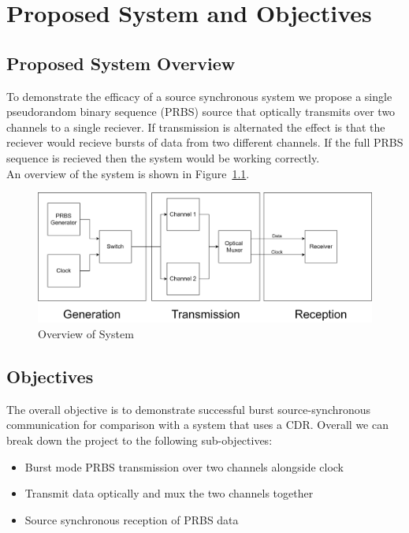 \chapter{Proposed System and Objectives}

\section{Proposed System Overview}%
\label{sec:system_overview}
To demonstrate the efficacy of a source synchronous system we propose a single
pseudorandom binary sequence (PRBS) source that optically transmits over two
channels to a single reciever. If transmission is alternated the effect is that
the reciever would recieve bursts of data from two different channels. If the
full PRBS sequence is recieved then the system would be working correctly.\\ An
overview of the system is shown in Figure~\ref{fig:overview}. 

\begin{figure}[h]
    \centering
    \includegraphics[width=1\linewidth]{img/overview.png}
    \caption{Overview of System}%
    \label{fig:overview}
\end{figure}

\section{Objectives}%
\label{sec:objectives}
The overall objective is to demonstrate successful burst source-synchronous
communication for comparison with a system that uses a CDR.
\noindent
Overall we can break down the project to the following sub-objectives: 
\begin{itemize}
    \item Burst mode PRBS transmission over two channels alongside clock
    \item Transmit data optically and mux the two channels together
    \item Source synchronous reception of PRBS data 
\end{itemize}
